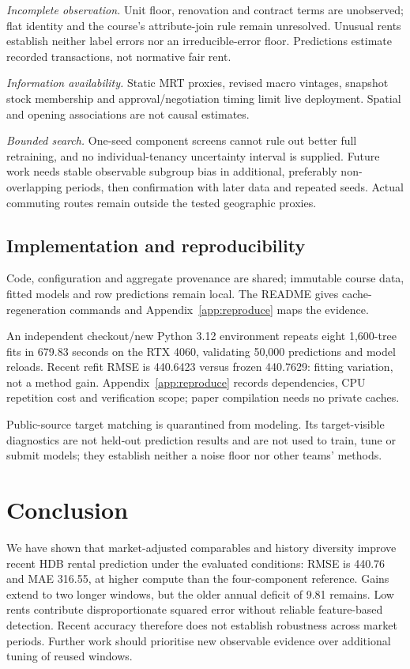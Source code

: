 \documentclass[conference]{IEEEtran}
\begin{document}
\textit{Incomplete observation.} Unit floor, renovation and contract terms are unobserved; flat identity and the course's attribute-join rule remain unresolved. Unusual rents establish neither label errors nor an irreducible-error floor. Predictions estimate recorded transactions, not normative fair rent.

\textit{Information availability.} Static MRT proxies, revised macro vintages, snapshot stock membership and approval/negotiation timing limit live deployment. Spatial and opening associations are not causal estimates.

\textit{Bounded search.} One-seed component screens cannot rule out better full retraining, and no individual-tenancy uncertainty interval is supplied. Future work needs stable observable subgroup bias in additional, preferably non-overlapping periods, then confirmation with later data and repeated seeds. Actual commuting routes remain outside the tested geographic proxies.

\subsection{Implementation and reproducibility}
Code, configuration and aggregate provenance are shared; immutable course data, fitted models and row predictions remain local. The README gives cache-regeneration commands and Appendix~\ref{app:reproduce} maps the evidence.

An independent checkout/new Python 3.12 environment repeats eight 1,600-tree fits in 679.83 seconds on the RTX 4060, validating 50,000 predictions and model reloads. Recent refit RMSE is 440.6423 versus frozen 440.7629: fitting variation, not a method gain. Appendix~\ref{app:reproduce} records dependencies, CPU repetition cost and verification scope; paper compilation needs no private caches.

Public-source target matching is quarantined from modeling. Its target-visible diagnostics are not held-out prediction results and are not used to train, tune or submit models; they establish neither a noise floor nor other teams' methods.

\section{Conclusion}
We have shown that market-adjusted comparables and history diversity improve recent HDB rental prediction under the evaluated conditions: RMSE is 440.76 and MAE 316.55, at higher compute than the four-component reference. Gains extend to two longer windows, but the older annual deficit of 9.81 remains. Low rents contribute disproportionate squared error without reliable feature-based detection. Recent accuracy therefore does not establish robustness across market periods. Further work should prioritise new observable evidence over additional tuning of reused windows.
\end{document}
